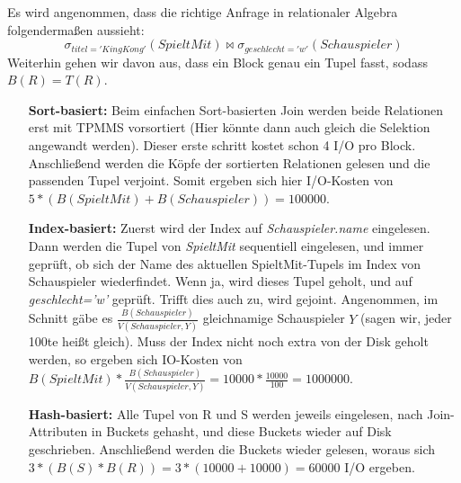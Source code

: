 \documentclass[12pt]{article}
\begin{document}
Es wird angenommen, dass die richtige Anfrage in relationaler Algebra folgendermaßen aussieht:
$$\sigma_{titel='King Kong'}(SpieltMit) \bowtie \sigma_{geschlecht='w'}(Schauspieler)$$
Weiterhin gehen wir davon aus, dass ein Block genau ein Tupel fasst, sodass
$B(R) = T(R)$.
\newline
\begin{itemize}[leftmargin=5em]
    \item[\textbf{Sort-basiert:}] Beim einfachen Sort-basierten Join
        werden beide Relationen erst mit TPMMS vorsortiert (Hier könnte dann auch
        gleich die Selektion angewandt werden). Dieser erste schritt kostet
        schon 4 I/O pro Block. Anschließend werden die Köpfe der sortierten
        Relationen gelesen und die passenden Tupel verjoint. Somit ergeben sich
        hier I/O-Kosten von $5*(B(SpieltMit)+B(Schauspieler)) = 100000$.

    \item[\textbf{Index-basiert:}] Zuerst wird der Index auf
        \textit{Schauspieler.name} eingelesen. Dann werden die Tupel von
        \textit{SpieltMit} sequentiell eingelesen, und immer geprüft, ob sich
        der Name des aktuellen SpieltMit-Tupels im Index von Schauspieler
        wiederfindet. Wenn ja, wird dieses Tupel geholt, und auf
        \textit{geschlecht='w'} geprüft. Trifft dies auch zu, wird gejoint.
        Angenommen, im Schnitt gäbe es
        $\frac{B(Schauspieler)}{V(Schauspieler,Y)}$ gleichnamige Schauspieler
        $Y$ (sagen wir, jeder 100te heißt gleich). Muss der Index nicht noch extra von der Disk geholt werden,
        so ergeben sich IO-Kosten von
        $B(SpieltMit)*\frac{B(Schauspieler)}{V(Schauspieler,Y)} = 10000 * \frac{10000}{100} = 1000000$.

    \item[\textbf{Hash-basiert:}] Alle Tupel von R und S werden jeweils
        eingelesen, nach Join-Attributen in Buckets gehasht, und diese Buckets
        wieder auf Disk geschrieben. Anschließend werden die Buckets wieder
        gelesen, woraus sich $3*(B(S)*B(R)) = 3*(10000+10000) = 60000$ I/O
        ergeben.
\end{itemize}
\end{document}
